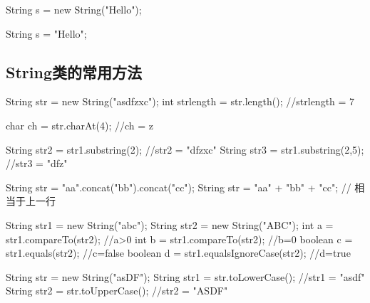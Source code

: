 
\begin{javaCode}
  String s = new String("Hello");
\end{javaCode}


\begin{javaCode}
  String s = "Hello";
\end{javaCode}

\subsection{String类的常用方法}


\begin{javaCode}
  String str = new String("asdfzxc");
  int strlength = str.length(); //strlength = 7
\end{javaCode}


\begin{javaCode}
  char ch = str.charAt(4); //ch = z
\end{javaCode}


\begin{javaCode}
  String str2 = str1.substring(2); //str2 = "dfzxc"
  String str3 = str1.substring(2,5); //str3 = "dfz"
\end{javaCode}


\begin{javaCode}
  String str = "aa".concat("bb").concat("cc");
  String str = "aa" + "bb" + "cc"; // 相当于上一行
\end{javaCode}



\begin{javaCode}
  String str1 = new String("abc");
  String str2 = new String("ABC");
  int a = str1.compareTo(str2);  //a>0
  int b = str1.compareTo(str2);  //b=0
  boolean c = str1.equals(str2); //c=false
  boolean d = str1.equalsIgnoreCase(str2); //d=true
\end{javaCode}


\begin{javaCode}
  String str = new String("asDF");
  String str1 = str.toLowerCase(); //str1 = "asdf"
  String str2 = str.toUpperCase(); //str2 = "ASDF"
\end{javaCode}

